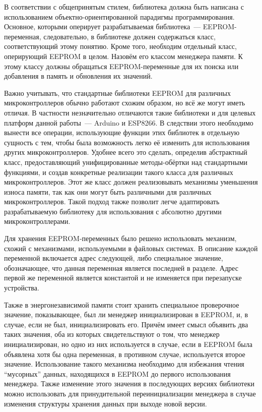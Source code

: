 В соответствии с общепринятым стилем, библиотека должна быть написана с использованием объектно-ориентированной парадигмы программирования.
Основное, которыми оперирует разрабатываемая библиотека~--- EEPROM-переменная, следовательно, в библиотеке должен содержаться класс, соответствующий этому понятию.
Кроме того, необходим отдельный класс, оперирующий EEPROM в целом. Назовём его классом менеджера памяти.
К этому классу должны обращаться EEPROM-переменные для их поиска или добавления в память и обновления их значений.

Важно учитывать, что стандартные библиотеки EEPROM для различных микроконтроллеров обычно работают схожим образом, но всё же могут иметь отличая.
В частности незначительно отличаются такие библиотеки и для целевых платформ данной работы~--- Arduino и ESP8266.
В следствии этого необходимо вынести все операции, использующие функции этих библиотек в отдельную сущность с тем, чтобы была возможность легко её изменить для использования других микроконтроллеров.
Удобнее всего это сделать, определив абстрактный класс, предоставляющий унифицированные методы-обёртки над стандартными функциями, и создав конкретные реализации такого класса для различных микроконтроллеров.
Этот же класс должен реализовывать механизмы уменьшения износа памяти, так как они могут быть различными для различных микроконтроллеров.
Такой подход также позволит легче адаптировать разрабатываемую библиотеку для использования с абсолютно другими микроконтроллерами.

Для хранения EEPROM-переменных было решено использовать механизм, схожий с механизмами, используемыми в файловых системах.
В описание каждой переменной включается адрес следующей, либо специальное значение, обозначающее, что данная переменная является последней в разделе.
Адрес первой же переменной является константой и не изменяется при перезапуске устройства.

Также в энергонезависимой памяти стоит хранить специальное проверочное значение, показывающее, был ли менеджер инициализирован в EEPROM, и, в случае, если не был, инициализировать его.
Причём имеет смысл объявить два таких значения, оба из которых свидетельствуют о том, что менеджер инициализирован, но одно из них используется в случае, если в EEPROM была объявлена хотя бы одна переменная, в противном случае, используется второе значение.
Использование такого механизма необходимо для избежания чтения "`мусорных"' данных, находящихся в EEPROM до первого использования менеджера.
Также изменение этого значения в последующих версиях библиотеки можно использовать для принудительной переинициализации менеджера в случае изменения структуры хранения данных при выходе новой версии.

